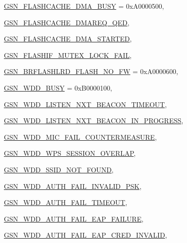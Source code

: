 \begin{DoxyCompactItemize}
\par
\hyperlink{a00659_gga476ae1caf992f8287176b2cc414c8707ad021dcbdc8e141eed8f82badd8bf12b4}{GSN\_\-FLASHCACHE\_\-DMA\_\-BUSY} =  0xA0000500, 
\par
\hyperlink{a00659_gga476ae1caf992f8287176b2cc414c8707ac38623a21b92fe4732336265f1af2fcf}{GSN\_\-FLASHCACHE\_\-DMAREQ\_\-QED}, 
\par
\hyperlink{a00659_gga476ae1caf992f8287176b2cc414c8707a5c9613626f43ec72e0d76dc99b699d2c}{GSN\_\-FLASHCACHE\_\-DMA\_\-STARTED}, 
\par
\hyperlink{a00659_gga476ae1caf992f8287176b2cc414c8707aa282f94d90cedc1d3a198026cb052218}{GSN\_\-FLASHIF\_\-MUTEX\_\-LOCK\_\-FAIL}, 
\par
\hyperlink{a00659_gga476ae1caf992f8287176b2cc414c8707aeee05439ac123ff8e591714cb9c89a44}{GSN\_\-BRFLASHLRD\_\-FLASH\_\-NO\_\-FW} =  0xA0000600, 
\par
\hyperlink{a00659_gga476ae1caf992f8287176b2cc414c8707a4d536d2369771fb198475b0431b77c90}{GSN\_\-WDD\_\-BUSY} =  0xB0000100, 
\par
\hyperlink{a00659_gga476ae1caf992f8287176b2cc414c8707ae4e500af9a63d9892265ebe5d7131544}{GSN\_\-WDD\_\-LISTEN\_\-NXT\_\-BEACON\_\-TIMEOUT}, 
\par
\hyperlink{a00659_gga476ae1caf992f8287176b2cc414c8707a7d29b0c6df61d8c975f0dfc1380235cd}{GSN\_\-WDD\_\-LISTEN\_\-NXT\_\-BEACON\_\-IN\_\-PROGRESS}, 
\par
\hyperlink{a00659_gga476ae1caf992f8287176b2cc414c8707a39a1d90a1788404b1e5751a3ffd547f4}{GSN\_\-WDD\_\-MIC\_\-FAIL\_\-COUNTERMEASURE}, 
\par
\hyperlink{a00659_gga476ae1caf992f8287176b2cc414c8707ab2321655a5c470b9ff45d82e8391f309}{GSN\_\-WDD\_\-WPS\_\-SESSION\_\-OVERLAP}, 
\par
\hyperlink{a00659_gga476ae1caf992f8287176b2cc414c8707a6a629838a54b64ede667d8a1b9c5adf4}{GSN\_\-WDD\_\-SSID\_\-NOT\_\-FOUND}, 
\par
\hyperlink{a00659_gga476ae1caf992f8287176b2cc414c8707ac3620a5c96c62e4658076868851218db}{GSN\_\-WDD\_\-AUTH\_\-FAIL\_\-INVALID\_\-PSK}, 
\par
\hyperlink{a00659_gga476ae1caf992f8287176b2cc414c8707a725564e28dca7eb97907f548b0f40dd6}{GSN\_\-WDD\_\-AUTH\_\-FAIL\_\-TIMEOUT}, 
\par
\hyperlink{a00659_gga476ae1caf992f8287176b2cc414c8707a561bc7dacb093e9b39e76202a5ca8dba}{GSN\_\-WDD\_\-AUTH\_\-FAIL\_\-EAP\_\-FAILURE}, 
\par
\hyperlink{a00659_gga476ae1caf992f8287176b2cc414c8707ad61ac3fa7b748e9c982067f14b4c2e65}{GSN\_\-WDD\_\-AUTH\_\-FAIL\_\-EAP\_\-CRED\_\-INVALID}, 

\end{DoxyCompactItemize}
